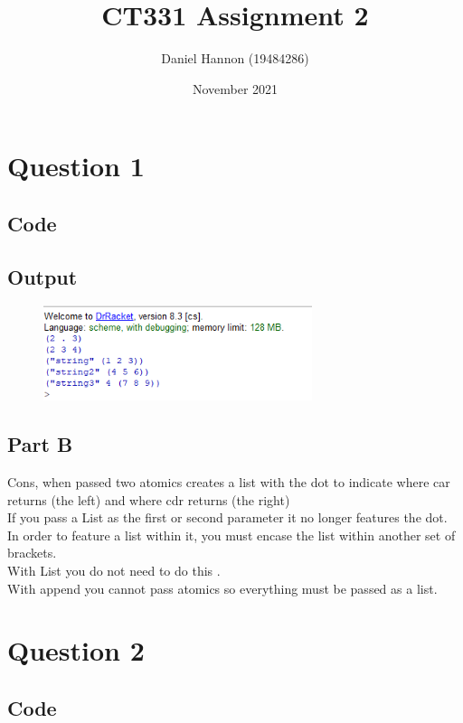 \documentclass{article}
\title{CT331 Assignment 2}
\author{Daniel Hannon (19484286)}
\date{November 2021}
\begin{document}
	\maketitle
	\section{Question 1}
		\subsection{Code}
		\subsection{Output}
			\begin{figure}[h!]
				\centering
				\includegraphics[width=0.7\textwidth]{1}
			\end{figure}
		\subsection{Part B}
			Cons, when passed two atomics creates a list with the dot to indicate where car returns (the left) and where cdr returns (the right)\\
			If you pass a List as the first or second parameter it no longer features the dot.\\
			In order to feature a list within it, you must encase the list within another set of brackets.\\
			With List you do not need to do this .\\
			With append you cannot pass atomics so everything must be passed as a list.
			
		\newpage
	\section{Question 2}
		\subsection{Code}
			\newpage
\end{document}

